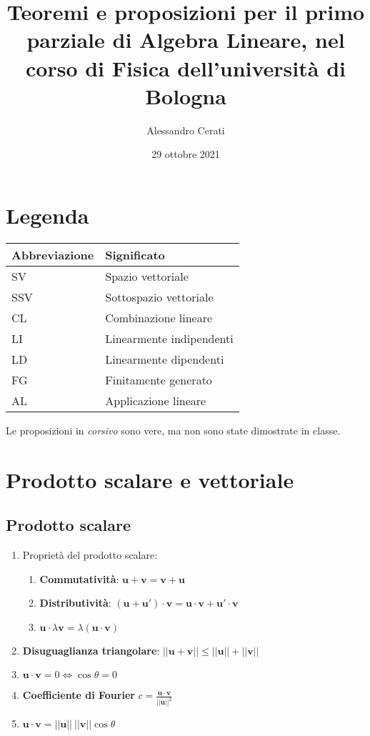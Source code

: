 \documentclass[draft]{article}
\newcommand{\bl}[1]{\mathbf{#1}}
\newcommand{\vu}{\mathbf{u}}
\newcommand{\vv}{\mathbf{v}}
\begin{document}
\title{Teoremi e proposizioni per il primo parziale di Algebra Lineare, nel corso di Fisica dell'università di Bologna}
\author{Alessandro Cerati}
\date{29 ottobre 2021}
\maketitle

\tableofcontents
\newpage

\section{Legenda}
\begin{tabular}{ll}
Abbreviazione	& 	Significato \\
\toprule
SV				&	Spazio vettoriale \\
SSV				& 	Sottospazio vettoriale \\
CL				& 	Combinazione lineare \\
LI				&	Linearmente indipendenti \\
LD				& 	Linearmente dipendenti \\
FG 				&	Finitamente generato \\
AL				& 	Applicazione lineare \\
\end{tabular}


Le proposizioni in \textit{corsivo} sono vere, ma non sono state dimostrate in classe.
\section{Prodotto scalare e vettoriale}

\subsection{Prodotto scalare}

\begin{enumerate}

\item Proprietà del prodotto scalare:
\begin{enumerate}
\item \textbf{Commutatività}: $\vu + \vv = \vv + \vu$ 
\item \textbf{Distributività}: $(\vu + \bl{u'}) \cdot \vv = \vu \cdot \vv + \bl{u'} \cdot \vv $ 
\item $\vu \cdot \lambda \vv = \lambda (\vu \cdot \vv) $
\end{enumerate}

\item \textbf{Disuguaglianza triangolare}: $||\vu+\vv|| \leq ||\vu|| + ||\vv|| $
 
\item $\vu \cdot \vv = 0 \Leftrightarrow \cos \theta = 0$

\item \textbf{Coefficiente di Fourier} $c=\frac{\vu \cdot \vv}{||\vu||^2}$

\item $\vu \cdot \vv = ||\vu|| \ ||\vv|| \cos \theta $
\end{enumerate}
\end{document}
